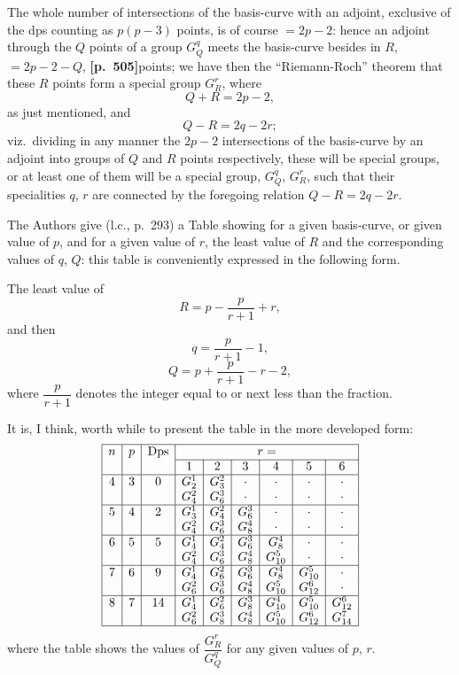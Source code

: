 \documentclass[11pt,a4paper]{article}
\begin{document}
The whole number of intersections of the basis-curve with an adjoint, exclusive of the dps counting as $p(p - 3)$ points, is of course $= 2p - 2$: hence an adjoint through the $Q$ points of a group $G_{Q}^{q}$ meets the basis-curve besides in $R$, $= 2p - 2 - Q$, \noindent\textbf{[p.~505]}\quad points; we have then the ``Riemann-Roch'' theorem that these $R$ points form a special group $G_{R}^{r}$, where
\[
Q + R = 2p - 2,
\]
as just mentioned, and
\[
Q - R = 2q - 2r;
\]
viz.\ dividing in any manner the $2p - 2$ intersections of the basis-curve by an adjoint into groups of $Q$ and $R$ points respectively, these will be special groups, or at least one of them will be a special group, $G_{Q}^{q}$, $G_{R}^{r}$, such that their specialities $q$, $r$ are connected by the foregoing relation $Q - R = 2q - 2r$.

The Authors give (l.c., p.~293) a Table showing for a given basis-curve, or given value of $p$, and for a given value of $r$, the least value of $R$ and the corresponding values of $q$, $Q$: this table is conveniently expressed in the following form.

The least value of
\[
R = p - \frac{p}{r + 1} + r,
\]
and then
\[
q = \frac{p}{r + 1} - 1,
\]
\[
Q = p + \frac{p}{r + 1} - r - 2,
\]
where $\dfrac{p}{r + 1}$ denotes the integer equal to or next less than the fraction.

It is, I think, worth while to present the table in the more developed form:
\[
\begin{array}{|c|c|c|c|c|c|c|c|c|}
\hline
n & p & \text{Dps} & \multicolumn{6}{c|}{r =} \\
\cline{4-9}
 & & & 1 & 2 & 3 & 4 & 5 & 6 \\
\hline
4 & 3 & 0 & G_{2}^{1} & G_{3}^{2} & \cdot & \cdot & \cdot & \cdot \\
 & & & G_{4}^{2} & G_{6}^{3} & \cdot & \cdot & \cdot & \cdot \\
\hline
5 & 4 & 2 & G_{3}^{1} & G_{4}^{2} & G_{6}^{3} & \cdot & \cdot & \cdot \\
 & & & G_{4}^{2} & G_{6}^{3} & G_{8}^{4} & \cdot & \cdot & \cdot \\
\hline
6 & 5 & 5 & G_{4}^{1} & G_{4}^{2} & G_{6}^{3} & G_{8}^{4} & \cdot & \cdot \\
 & & & G_{4}^{2} & G_{6}^{3} & G_{8}^{4} & G_{10}^{5} & \cdot & \cdot \\
\hline
7 & 6 & 9 & G_{4}^{1} & G_{6}^{2} & G_{6}^{3} & G_{8}^{4} & G_{10}^{5} & \cdot \\
 & & & G_{6}^{2} & G_{6}^{3} & G_{8}^{4} & G_{10}^{5} & G_{12}^{6} & \cdot \\
\hline
8 & 7 & 14 & G_{4}^{1} & G_{6}^{2} & G_{8}^{3} & G_{10}^{4} & G_{10}^{5} & G_{12}^{6} \\
 & & & G_{6}^{2} & G_{8}^{3} & G_{8}^{4} & G_{10}^{5} & G_{12}^{6} & G_{14}^{7} \\
\hline
\end{array}
\]
where the table shows the values of $\dfrac{G_{R}^{r}}{G_{Q}^{q}}$ for any given values of $p$, $r$.
\end{document}
